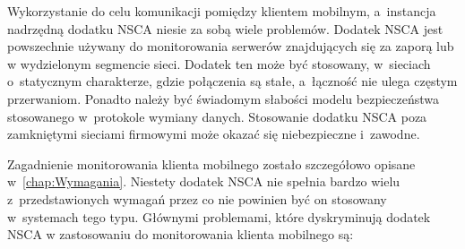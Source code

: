 Wykorzystanie do celu komunikacji pomiędzy klientem mobilnym,
a~instancja nadrzędną dodatku NSCA niesie za sobą wiele problemów.
Dodatek NSCA jest powszechnie używany do monitorowania serwerów
znajdujących się za zaporą lub w wydzielonym segmencie sieci. Dodatek
ten może być stosowany, w~sieciach o~statycznym charakterze, gdzie
połączenia są stałe, a~łączność nie ulega częstym przerwaniom. Ponadto
należy być świadomym słabości modelu bezpieczeństwa stosowanego
w~protokole wymiany danych. Stosowanie dodatku NSCA poza zamkniętymi
sieciami firmowymi może okazać się niebezpieczne i~zawodne.

Zagadnienie monitorowania klienta mobilnego zostało szczegółowo opisane
w~\ref{chap:Wymagania}. Niestety dodatek NSCA nie spełnia bardzo wielu
z~przedstawionych wymagań przez co nie powinien być on stosowany
w~systemach tego typu. Głównymi problemami, które dyskryminują dodatek
NSCA w zastosowaniu do monitorowania klienta mobilnego są:

